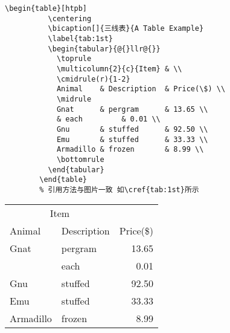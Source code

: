 \begin{center}
  \begin{minipage}{0.95\textwidth}
    \small
    \begin{Verbatim}[frame=single]
        \begin{table}[htpb]
          \centering
          \bicaption[]{三线表}{A Table Example}
          \label{tab:1st}
          \begin{tabular}{@{}llr@{}}
            \toprule
            \multicolumn{2}{c}{Item} & \\
            \cmidrule(r){1-2}
            Animal    & Description  & Price(\$) \\
            \midrule
            Gnat      & pergram      & 13.65 \\
            & each         & 0.01 \\
            Gnu       & stuffed      & 92.50 \\
            Emu       & stuffed      & 33.33 \\
            Armadillo & frozen       & 8.99 \\
            \bottomrule
          \end{tabular}
        \end{table}
        % 引用方法与图片一致 如\cref{tab:1st}所示
    \end{Verbatim}
  \end{minipage}
\end{center}

        \begin{table}[htpb]
          \centering
          \label{tab:1st}
          \begin{tabular}{@{}llr@{}}
            \toprule
            \multicolumn{2}{c}{Item} & \\
            \cmidrule(r){1-2}
            Animal    & Description  & Price(\$) \\
            \midrule
            Gnat      & pergram      & 13.65 \\
            & each         & 0.01 \\
            Gnu       & stuffed      & 92.50 \\
            Emu       & stuffed      & 33.33 \\
            Armadillo & frozen       & 8.99 \\
            \bottomrule
          \end{tabular}
        \end{table}

